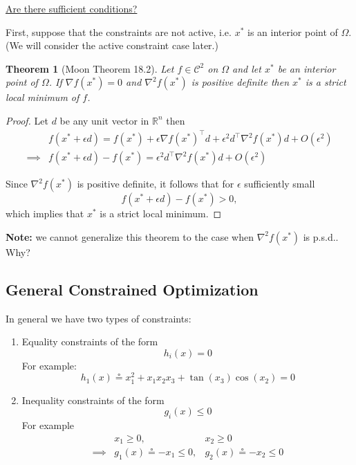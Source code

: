 \documentclass{article}
\newtheorem{theorem}{Theorem}[section]
\newcommand{\defeq}{\circeq}
\begin{document}
	\underline{Are there sufficient conditions?}
	
	
	First, suppose that the constraints are not active, i.e. $x^{\ast}$ is an interior point of $\Omega$.  (We will consider the active constraint case later.)
	
	
	\begin{theorem}[Moon Theorem 18.2]
		Let $f \in \mathcal{C}^2$ on $\Omega$ and let $x^{\ast}$ be an interior point of $\Omega$.  If $\nabla f(x^{\ast}) = 0$ and $\nabla^2f(x^{\ast})$ is positive definite then $x^{\ast}$ is a strict local minimum of $f$.
	\end{theorem}
	\begin{proof}
		Let $d$ be any unit vector in $\mathbb{R}^n$ then 
		\begin{align*}
			& 	f(x^{\ast} + \epsilon d) = f(x^{\ast}) + \epsilon\nabla f(x^{\ast})^\top d + \epsilon^2d^\top \nabla^2f(x^{\ast})d + O(\epsilon^2) \\
			\implies & 
			f(x^{\ast} + \epsilon d)  - f(x^{\ast}) = \epsilon^2d^\top \nabla^2f(x^{\ast})d + O(\epsilon^2)
		\end{align*}
	
		Since $\nabla^2f(x^{\ast})$ is positive definite, it follows that for $\epsilon$ sufficiently small
		\[ 
			f(x^{\ast}+\epsilon d) - f(x^{\ast}) > 0,
		\]
		which implies that $x^{\ast}$ is a strict local minimum. 	
	\end{proof}
	
	
	{\bf Note:} we cannot generalize this theorem to the case when $\nabla^2f(x^{\ast})$ is p.s.d..  Why?

\subsection{General Constrained Optimization}

	In general we have two types of constraints:
	\begin{enumerate}
		\item 	
			Equality constraints of the form
			\[ 
				h_i(x) = 0 
			\]
			For example:
			\[
				h_1(x) \defeq x_1^2 + x_1x_2x_3 + \tan(x_3)\cos(x_2) = 0
			\]
			
		\item 
			Inequality constraints of the form
			\[ 
				g_i(x) \leq 0 
			\]
			For example
			\begin{align*}
				& x_1 \geq 0, & x_2 \geq 0 \\
				\implies & g_1(x)\defeq -x_1 \leq 0, & g_2(x) \defeq -x_2 \leq 0 
			\end{align*}
			\end{enumerate}
\end{document}
